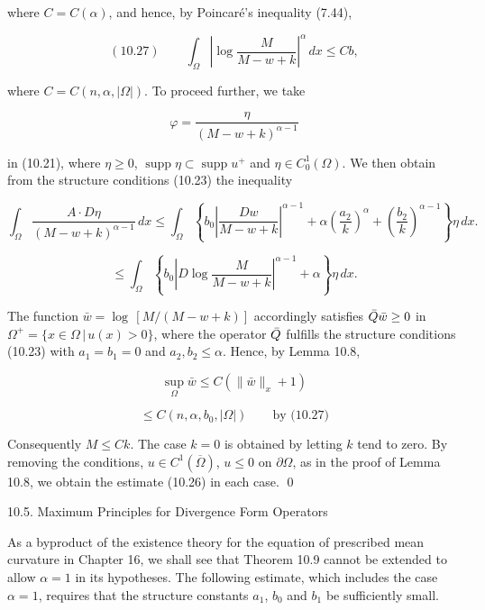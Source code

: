 \begin{enumerate}
where $C=C(\alpha)$, and hence, by Poincaré’s inequality (7.44),

\[
(10.27)\qquad \int_{\Omega}\left|\log\frac{M}{M-w+k}\right|^{\alpha}\,dx\le Cb,
\]

where $C=C(n,\alpha,|\Omega|)$. To proceed further, we take

\[
\varphi=\frac{\eta}{(M-w+k)^{\alpha-1}}
\]

in (10.21), where $\eta\ge 0$, $\operatorname{supp}\eta\subset \operatorname{supp}u^{+}$ and $\eta\in C_0^1(\Omega)$. We then obtain from the structure conditions (10.23) the inequality

\[
\int_{\Omega}\frac{A\cdot D\eta}{(M-w+k)^{\alpha-1}}\,dx\le \int_{\Omega}\left\{b_0\left|\frac{Dw}{M-w+k}\right|^{\alpha-1}+\alpha\left(\frac{a_2}{k}\right)^{\alpha}+\left(\frac{b_2}{k}\right)^{\alpha-1}\right\}\eta\,dx.
\]

\[
\le \int_{\Omega}\left\{b_0\left|D\log\frac{M}{M-w+k}\right|^{\alpha-1}+\alpha\right\}\eta\,dx.
\]

The function $\bar{w}=\log\,[M/(M-w+k)]$ accordingly satisfies $\bar{Q} \bar{w}\ge 0$ in $\Omega^{+}=\{x\in \Omega\,|\,u(x)>0\}$, where the operator $\bar{Q}$ fulfills the structure conditions (10.23) with $a_1=b_1=0$ and $a_2,b_2\le \alpha$. Hence, by Lemma 10.8,

\[
\sup_{\Omega}\bar{w}\le C(\|\bar{w}\|_{x}+1)
\]

\[
\le C(n,\alpha,b_0,|\Omega|)\qquad \text{by (10.27)}
\]

Consequently $M\le Ck$. The case $k=0$ is obtained by letting $k$ tend to zero. By removing the conditions, $u\in C^1(\overline{\Omega})$, $u\le 0$ on $\partial\Omega$, as in the proof of Lemma 10.8, we obtain the estimate (10.26) in each case. \qed

\end{enumerate}


10.5. Maximum Principles for Divergence Form Operators

As a byproduct of the existence theory for the equation of prescribed mean
curvature in Chapter 16, we shall see that Theorem 10.9 cannot be extended to allow
$\alpha=1$ in its hypotheses. The following estimate, which includes the case $\alpha=1$,
requires that the structure constants $a_1$, $b_0$ and $b_1$ be sufficiently small.

\medskip

